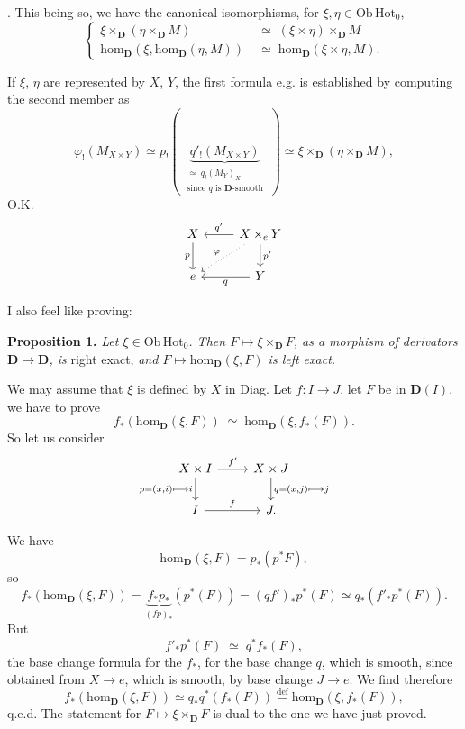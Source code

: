 \documentclass[11pt]{article}
\newcommand{\printedpage}[1]{\marginpar{\footnotesize p.~#1}}
\newcommand{\msp}[1]{\marginpar{\footnotesize [#1]}}
\newcommand{\D}{\mathbf{D}}
\newcommand{\Hot}{\mathrm{Hot}}
\newcommand{\hm}{\mathrm{hom}}
\newcommand{\Ob}{\mathrm{Ob}\,}
\newcommand{\defeq}{\overset{\text{def}}{=}}
\begin{document}
\printedpage{4}

. This being so, we have the canonical isomorphisms, for $\xi,\eta\in\Ob\Hot_0$,
\[
\left\{
\begin{aligned}
\xi\times_{\D}(\eta\times_{\D}M) &\;\simeq\; (\xi\times\eta)\times_{\D}M\\
\hm_{\D}(\xi,\hm_{\D}(\eta,M)) &\;\simeq\; \hm_{\D}(\xi\times\eta,M).
\end{aligned}
\right.
\tag*{(9)}
\]

If $\xi$, $\eta$ are represented by $X$, $Y$, the first formula e.g.
\msp{page 6}
is established by computing the second member as
\[
\varphi_!(M_{X\times Y})\simeq p_!(\;\underbrace{q'_!(M_{X\times Y})}_{\substack{\simeq\ q_!(M_Y)_X\\ \text{since $q$ is $\mathbf{D}$-smooth}}}\;)\simeq\xi\times_{\D}(\eta\times_{\D}M),
\]
O.K.
\[
\begin{tikzcd}
X \ar[d,"p"'] & X\times_e Y \ar[l,"q'"'] \ar[d,"p'"] \ar[dl,dotted,"\varphi"'] \\
e & Y \ar[l,"q"]
\end{tikzcd}
\]

I also feel like proving:

\textbf{Proposition 1.} \textit{Let $\xi\in\Ob\Hot_0$. Then $F\longmapsto\xi\times_{\D}F$, as a morphism of derivators $\D\longrightarrow\D$, is} right exact, \textit{and $F\longmapsto\hm_{\D}(\xi,F)$ is left exact.}

We may assume that $\xi$ is defined by $X$ in Diag. Let $f:I\longrightarrow J$, let $F$ be in $\D(I)$, we have to prove
\[
f_*(\hm_{\D}(\xi,F))\;\simeq\;\hm_{\D}(\xi,f_*(F)).
\]
So let us consider
\[
\begin{tikzcd}
X\times I \ar[r,"f'"] \ar[d,"{p=(x,i)\longmapsto i}"'] & X\times J \ar[d,"{q=(x,j)\longmapsto j}"] \\
I \ar[r,"f"] & J.
\end{tikzcd}
\]

We have
\[
\hm_{\D}(\xi,F)=p_*(p^*F),
\]
so
\[
f_*(\hm_{\D}(\xi,F))=\underbrace{f_*p_*}_{(fp)_*}(p^*(F))=(qf')_*p^*(F)\simeq q_*(f'_*p^*(F)).
\]
But
\[
f'_*p^*(F)\;\simeq\;q^*f_*(F),
\]
the base change formula for the $f_*$, for the base change $q$, which is smooth, since obtained from $X\longrightarrow e$, which is smooth, by base change $J\longrightarrow e$. We find
\printedpage{5}
\msp{page 7}
therefore
\[
f_*(\hm_{\D}(\xi,F))\simeq q_*q^*(f_*(F))\defeq\hm_{\D}(\xi,f_*(F)),
\]
q.e.d. The statement for $F\longmapsto\xi\times_{\D}F$ is dual to the one we have just proved.
\end{document}
